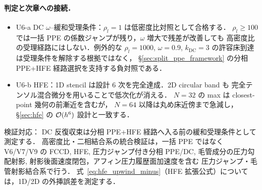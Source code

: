 \paragraph{判定と次章への接続．}
\begin{itemize}\setlength{\itemsep}{0pt}
  \item U6-a DC $\omega$--緩和受理条件：$\rho_l = 1$ は低密度比対照として合格する．
        $\rho_l \ge 100$ では一括 PPE の係数ジャンプが残り，$\omega$ 増大で残差が改善しても
        高密度比の受理経路にはしない．例外的な $\rho_l = 1000$, $\omega=0.9$,
        $k_{\mathrm{DC}}=3$ の許容床到達は受理条件を解除する根拠ではなく，
        §\ref{sec:split_ppe_framework} の分相 PPE+HFE 経路選択を支持する負対照である．\checkmark
  \item U6-b HFE：1D stencil は設計 6 次を完全達成．2D circular band も
        完全テンソル混合微分を用いることで低次化が消える．
        $N=32$ の max は closest-point 幾何の前漸近を含むが，
        $N=64$ 以降は丸め床近傍まで急減し，§\ref{sec:hfe} の
        $\mathcal{O}(h^6)$ 設計と一致する．\checkmark
\end{itemize}
検証対応：
DC 反復収束は分相 PPE+HFE 経路へ入る前の緩和受理条件として測定する．
高密度比・二相結合系の統合検証は，一括 PPE ではなく V6/V7/V9 の
FCCD, HFE, 圧力ジャンプ付き分相 PPE/DC, 毛管成分の圧力勾配射影,
射影後面速度閉包，アフィン圧力履歴面加速度を含む
圧力ジャンプ・毛管射影結合系で行う．
式~\eqref{eq:hfe_upwind_minus}（HFE 拡張公式）については，1D/2D の外挿誤差を測定する．

\FloatBarrier
